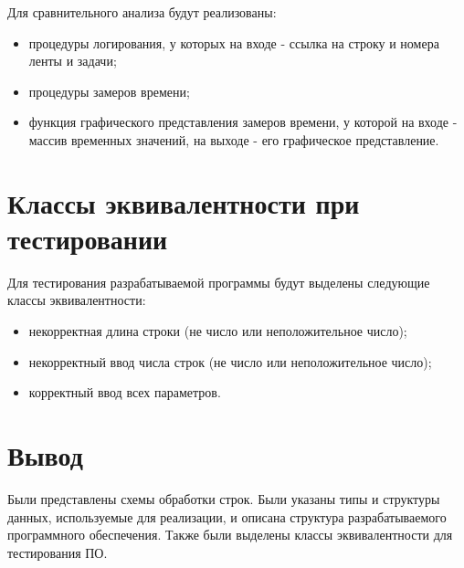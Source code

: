 Для сравнительного анализа будут реализованы:

\begin{itemize}
	\item процедуры логирования, у которых на входе - ссылка на строку и номера ленты и задачи;
	\item процедуры замеров времени;
	\item функция графического представления замеров времени, у которой на входе - массив временных значений, на выходе - его графическое представление.
\end{itemize}

\section{Классы эквивалентности при тестировании}

Для тестирования разрабатываемой программы будут выделены следующие классы эквивалентности:

\begin{itemize}
	\item некорректная длина строки (не число или неположительное число);
	\item некорректный ввод числа строк (не число или неположительное число);
	\item корректный ввод всех параметров.
\end{itemize}

\section{Вывод}

Были представлены схемы обработки строк. Были указаны типы и структуры данных, используемые для реализации, и описана структура разрабатываемого программного обеспечения. Также были выделены классы эквивалентности для тестирования ПО.
